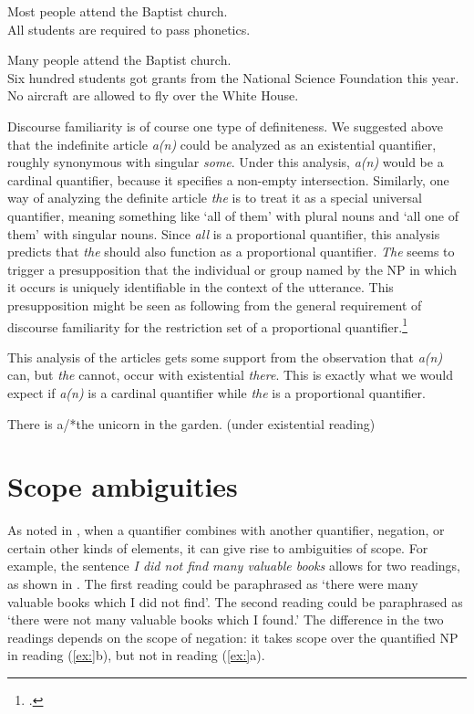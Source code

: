 \ea
\ea Most people attend the Baptist church.\\
\ex All students are required to pass phonetics.
                       \z
\z

\ea
\ea Many people attend the Baptist church.\\
\ex Six hundred students got grants from the National Science Foundation this year.\\
\ex No aircraft are allowed to fly over the White House.
                       \z
\z


Discourse familiarity is of course one type of definiteness. We suggested above that the indefinite article \textit{a(n)} could be analyzed as an existential quantifier, roughly synonymous with singular \textit{some}. Under this analysis, \textit{a(n)} would be a cardinal quantifier, because it specifies a non-empty intersection. Similarly, one way of analyzing the definite article \textit{the} is to treat it as a special universal quantifier, meaning something like ‘all of them’ with plural nouns and ‘all one of them’ with singular nouns. Since \textit{all} is a proportional quantifier, this analysis predicts that \textit{the} should also function as a proportional quantifier. \textit{The} seems to trigger a presupposition that the individual or group named by the NP in which it occurs is uniquely identifiable in the context of the utterance. This presupposition might be seen as following from the general requirement of discourse familiarity for the restriction set of a proportional quantifier.\footnote{\citet{Kearn2000}.}



This analysis of the articles gets some support from the observation that \textit{a(n)} can, but \textit{the} cannot, occur with existential \textit{there}. This is exactly what we would expect if \textit{a(n)} is a cardinal quantifier while \textit{the} is a proportional quantifier.


\ea






  There is a/*the unicorn in the garden.  (under existential reading)
\z

\section{Scope ambiguities}\label{sec:14.5}

As noted in , when a quantifier combines with another quantifier, negation, or certain other kinds of elements, it can give rise to ambiguities of scope. For example, the sentence \textit{I did not find many valuable books} allows for two readings, as shown in . The first reading could be paraphrased as ‘there were many valuable books which I did not find’. The second reading could be paraphrased as ‘there were not many valuable books which I found.’ The difference in the two readings depends on the scope of negation: it takes scope over the quantified NP in reading (\ref{ex:}b), but not in reading (\ref{ex:}a).


